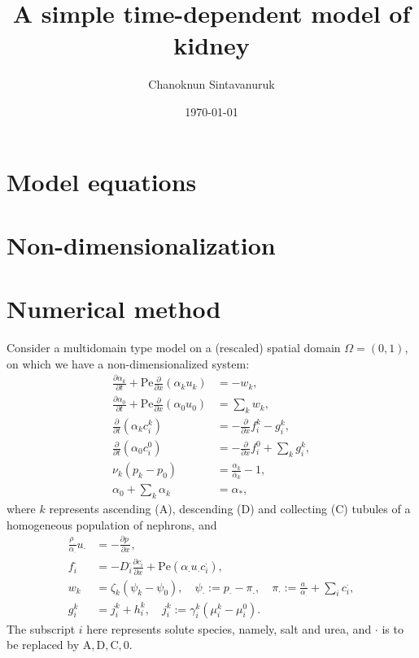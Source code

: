 \documentclass{article}
\title{A simple time-dependent model of kidney}
\author[1]{Chanoknun Sintavanuruk}
\date{\today}
\begin{document}
\sloppy %
\maketitle

\section{Model equations}

\section{Non-dimensionalization}


\section{Numerical method}
Consider a multidomain type model on a (rescaled) spatial domain $\Omega = (0,1)$, on which we have a non-dimensionalized system:
\begin{align}
    \frac{\partial \alpha_k}{\partial t}  + \mathrm{Pe}\frac{\partial}{\partial x}\left( \alpha_k u_k \right) &= - w_k,\\
    \frac{\partial\alpha_0}{\partial t}+\mathrm{Pe}\frac{\partial}{\partial x}\left( \alpha_0 u_0 \right) &=\sum_k w_k,\\
    \frac{\partial}{\partial t}\left( \alpha_k c_i^k \right)&=-\frac{\partial}{\partial x} f_i^k - g_i^k,\\
    \frac{\partial}{\partial t}\left( \alpha_0 c_i^0 \right)&=-\frac{\partial}{\partial x} f_i^0 + \sum_k g_i^k,\\
    \nu_k\left( p_k - p_0 \right) &= \frac{\alpha_k}{\bar{\alpha}_k}-1,\\
    \alpha_0 + \sum_{k} \alpha_k &= \alpha_*,
\end{align}
    where $k$ represents ascending ($\mathrm{A}$), descending ($\mathrm{D}$) and collecting ($\mathrm{C}$) tubules of a homogeneous population of nephrons, and
\begin{align}
    \frac{\rho_\cdot}{\alpha_\cdot}u_\cdot &= -\frac{\partial p_\cdot}{\partial x},\\
    f_i^\cdot&= -D_i^\cdot\frac{\partial c_i^\cdot}{\partial x}+\mathrm{Pe}\left( \alpha_\cdot u_\cdot c_i^\cdot \right),\\
    w_k&= \zeta_k\left( \psi_k-\psi_0 \right),\quad\psi_\cdot := p_\cdot - \pi_.,\quad \pi_\cdot := \frac{a_\cdot}{\alpha_\cdot}+\sum_i c_i^\cdot,\\
    g_i^k &= j_i^k+h_i^k,\quad j_i^k :=\gamma_i^k(\mu_i^k-\mu_i^0).
\end{align}
    The subscript $i$ here represents solute species, namely, salt and urea, and $\cdot$ is to be replaced by $\mathrm{A,D,C},0$.
\end{document}

